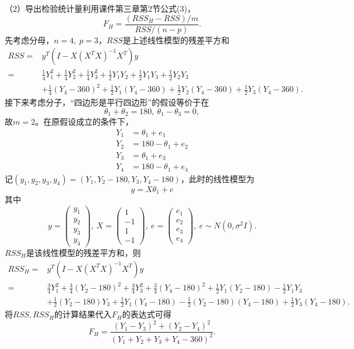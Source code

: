 \documentclass[cn,hazy,green,12pt,normal]{elegantnote}
\numberwithin{equation}{section}
\numberwithin{subsection}{section}
\begin{document}
（2）导出检验统计量利用课件第三章第2节公式(3)，
$$
F_H = \frac{(RSS_H - RSS)/m}{RSS/(n-p)}.
$$
先考虑分母，$n=4,\ p=3$，$RSS$是上述线性模型的残差平方和
\begin{align*}
    RSS =& y^T (I - X(X^T X)^{-1}X^T) y \\
    =& \frac{1}{4} Y_1^2 + \frac{1}{4} Y_2^2 + \frac{1}{4} Y_3^2 + \frac{1}{2} Y_1 Y_2 + \frac{1}{2} Y_1 Y_3 + \frac{1}{2} Y_2 Y_3 \\
    &+ \frac{1}{4} (Y_4-360)^2 + \frac{1}{2} Y_1 (Y_4-360) + \frac{1}{2} Y_2 (Y_4-360) + \frac{1}{2} Y_3 (Y_4-360).
\end{align*}
接下来考虑分子，“四边形是平行四边形”的假设等价于在
$$
\theta_1 + \theta_2 = 180, \ \theta_1 - \theta_3 = 0,
$$
故$m = 2$。在原假设成立的条件下，
\begin{align*}
    Y_1 &= \theta_1 + e_1 \\
    Y_2 &= 180 - \theta_1 + e_2 \\
    Y_3 &= \theta_1 + e_3 \\
    Y_4 &= 180 - \theta_1 + e_4
\end{align*}
记$(y_1,y_2,y_3,y_4) = (Y_1,Y_2-180,Y_3,Y_4-180)$，此时的线性模型为
$$
y = X \theta_1 + e
$$
其中
$$
y = \begin{pmatrix}
    y_1 \\
    y_2 \\
    y_3 \\
    y_4 
\end{pmatrix}, \
X = \begin{pmatrix}
    1 \\
    -1 \\
    1 \\
    -1 
\end{pmatrix}, \
e = \begin{pmatrix}
    e_1 \\
    e_2 \\
    e_3 \\
    e_4 
\end{pmatrix}, \
e \sim N(0,\sigma^2 I).
$$
$RSS_H$是该线性模型的残差平方和，则
\begin{align*}
    RSS_H =& y^T (I - X(X^T X)^{-1}X^T) y \\
    =& \frac{3}{4} Y_1^2 + \frac{3}{4} (Y_2-180)^2 + \frac{3}{4} Y_3^2 + \frac{3}{4} (Y_4-180)^2 + \frac{1}{2} Y_1 (Y_2-180) -\frac{1}{2} Y_1 Y_3 \\
    &+ \frac{1}{2} (Y_2-180) Y_3 + \frac{1}{2} Y_1 (Y_4-180) - \frac{1}{2} (Y_2-180)(Y_4-180) + \frac{1}{2} Y_3 (Y_4-180).
\end{align*}
将$RSS,RSS_H$的计算结果代入$F_H$的表达式可得
$$
F_H = \frac{(Y_1-Y_3)^2+(Y_2-Y_4)^2}{(Y_1+Y_2+Y_3+Y_4-360)^2}.
$$
\end{document}
